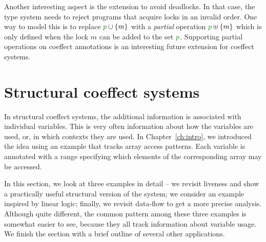 Another interesting aspect is the extension to avoid deadlocks. In that case, the type system
needs to reject programs that acquire locks in an invalid order. One way to model this is to 
replace $\cclrd{p} \cup \{m\}$ with a \emph{partial} operation $\cclrd{p} \uplus \{m\}$ which
is only defined when the lock $m$ can be added to the set $\cclrd{p}$. Supporting partial 
operations on coeffect annotations is an interesting future extension for coeffect systems.



%	                                                                      
%	                                                                      

\section{Structural coeffect systems}
\label{sec:applications-structural}

In structural coeffect systems, the additional information is associated with individual variables.
This is very often information about how the variables are used, or, in which contexts they are used. 
In Chapter~\ref{ch:intro}, we introduced the idea using an example that tracks array access patterns.  
Each variable is annotated with a range specifying which elements of the corresponding array 
may be accessed. 

In this section, we look at three examples in detail -- we revisit liveness and show a practically
useful structural version of the system; we consider an example inspired by linear logic; finally,
we revisit data-flow to get a more precise analysis. Although quite different, the common pattern
among these three examples is somewhat easier to see, because they all track information about 
variable usage. We finish the section with a brief outline of several other applications.

